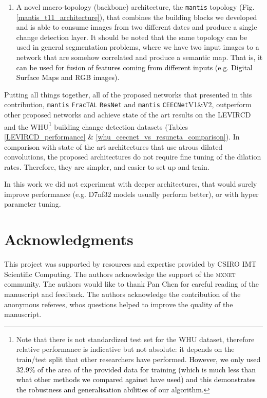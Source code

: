\documentclass[times, 5p]{elsarticle}
\def \FracTAL {\texttt{FracTAL} }
\newcommand{\ceecnet}{\texttt{CEECNet}}
\newcommand{\mantis}{\texttt{mantis}}
\begin{document}
\begin{enumerate}
\item A novel macro-topology (backbone) architecture, the \mantis{}      
 topology (Fig. \ref{mantis_t11_architecture}), that combines the building blocks we developed and is able to consume images from two different dates and produce a single change detection layer. It should be noted that the same topology can be used in general segmentation problems, where we have two input images to a network that are somehow correlated and produce a semantic map.   \textcolor{black}{That is, it can be used for fusion of features coming from different inputs (e.g. Digital Surface Maps and RGB images).} 
\end{enumerate}
Putting all things together, all of the proposed networks that presented in this contribution, \mantis{} \FracTAL \texttt{ResNet} and \mantis{} \ceecnet V1\&V2, outperform other proposed networks and achieve state of the art results on the LEVIRCD \citep{rs12101662} and the WHU\footnote{Note that there is not standardized test set for the WHU dataset, therefore relative performance is indicative but not absolute: it depends on the train/test split that other researchers have performed. \textcolor{black}{However, we only used 32.9\% of the area of the provided data for training (which is much less than what other methods we compared against have used) and this demonstrates the robustness and generalisation abilities of our algorithm.}} \citep{Ji2019FullyCN} building change detection datasets (Tables \ref{LEVIRCD_performance} \& \ref{whu_ceecnet_vs_resuneta_comparison}). 
In comparison with state of the art architectures that use atrous dilated convolutions, the proposed architectures do not require fine tuning of the dilation rates. Therefore, they are simpler, and easier to set up and train. 

In this work we did not experiment with deeper architectures, that would surely improve performance (e.g. D7nf32 models usually perform better), or with hyper parameter tuning.  


\section*{Acknowledgments}
This project was supported by resources and expertise provided by CSIRO IMT Scientific Computing.   
The authors acknowledge  the support of the \textsc{mxnet} community. The authors would like to thank Pan Chen for careful reading of the manuscript and feedback.   
The authors acknowledge the contribution of the anonymous referees, whos questions helped to improve the quality of the manuscript.
\end{document}
